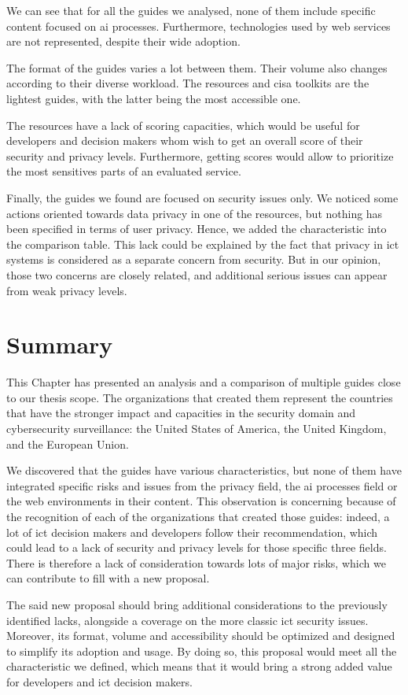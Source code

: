 We can see that for all the guides we analysed, none of them include specific content focused on \gls{ai} processes. Furthermore, technologies used by web services are not represented, despite their wide adoption.

The format of the guides varies a lot between them. Their volume also changes according to their diverse workload. The  resources and \gls{cisa} \Glspl{toolkit} are the lightest guides, with the latter being the most accessible one.

The resources have a lack of scoring capacities, which would be useful for developers and decision makers whom wish to get an overall score of their security and privacy levels. Furthermore, getting scores would allow to prioritize the most sensitives parts of an evaluated service.

Finally, the guides we found are focused on security issues only. We noticed some actions oriented towards data privacy in one of the  resources, but nothing has been specified in terms of user privacy. Hence, we added the  characteristic into the comparison table. This lack could be explained by the fact that privacy in \gls{ict} systems is considered as a separate concern from security. But in our opinion, those two concerns are closely related, and additional serious issues can appear from weak privacy levels.

\section{Summary}
\label{sec:comparison_summary}

This Chapter has presented an analysis and a comparison of multiple guides close to our thesis scope. The organizations that created them represent the countries that have the stronger impact and capacities in the security domain and cybersecurity surveillance: the United States of America, the United Kingdom, and the European Union.

We discovered that the guides have various characteristics, but none of them have integrated specific risks and issues from the privacy field, the \gls{ai} processes field or the web environments in their content. This observation is concerning because of the recognition of each of the organizations that created those guides: indeed, a lot of \gls{ict} decision makers and developers follow their recommendation, which could lead to a lack of security and privacy levels for those specific three fields. There is therefore a lack of consideration towards lots of major risks, which we can contribute to fill with a new proposal.

The said new proposal should bring additional considerations to the previously identified lacks, alongside a coverage on the more classic \gls{ict} security issues. Moreover, its format, volume and accessibility should be optimized and designed to simplify its adoption and usage. By doing so, this proposal would meet all the characteristic we defined, which means that it would bring a strong added value for developers and \gls{ict} decision makers.
